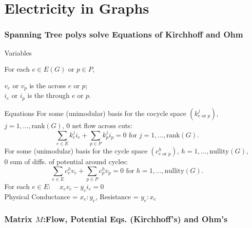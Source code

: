 \documentclass{beamer}
\begin{document}
\section{Electricity in Graphs}
\begin{frame}
\frametitle{Spanning Tree polys solve Equations of Kirchhoff and Ohm}
\begin{block}{Variables}
\begin{minipage}{1.25in}
For each $e\in E(G)$ or $p\in P$,
\end{minipage}
\begin{minipage}{2.7in}
$v_e$ or $v_p$ is the  across $e$ or $p$;\\
$i_e$ or $i_p$ is the  through $e$ or $p$.
\end{minipage}
\end{block}
\begin{block}{Equations}
For some (unimodular) basis for the cocycle space $(k^j_{e \text{ or } p})$,
$j=1,\ldots,\text{rank}(G)$, 0 net flow across cuts:
\[
\sum_{e\in E}k^j_e i_e + \sum_{p\in P} k^j_p i_p = 0
\text{ for }j=1,\ldots,\text{rank}(G).
\]
For some (unimodular) basis for the cycle space $(c^h_{e \text{ or } p})$,
$h=1,\ldots,\text{nullity}(G)$, 0 sum of diffs. of potential around cycles:
\[
\sum_{e\in E}c^h_e v_e + \sum_{p\in P} c^h_p v_p = 0
\text{ for }h=1,\ldots,\text{nullity}(G).
\]
For each $e\in E:\;\;\;$ $x_ev_e - y_ei_e = 0$\\
{\small Physical Conductance = $x_e:y_e$, Resistance = $y_e:x_e$}
\end{block}
\end{frame}


\begin{frame}
\frametitle{Matrix $M$:Flow, Potential Eqs. (Kirchhoff's) and Ohm's}

\end{frame}
\end{document}

